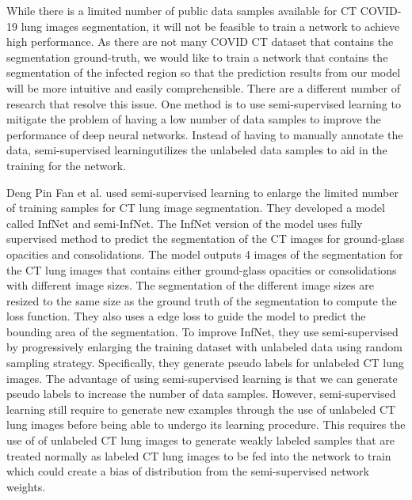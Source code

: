 While there is a limited number of public data samples available for CT COVID-19 lung images segmentation, it will not be feasible to train a network to achieve high performance. As there are not many COVID CT dataset that contains the segmentation ground-truth, we would like to train a network that contains the segmentation of the infected region so that the prediction results from our model will be more intuitive and easily comprehensible. There are a different number of research that resolve this issue. One method is to use semi-supervised learning to mitigate the problem of having a low number of data samples to improve the performance of deep neural networks. Instead of having to manually annotate the data, semi-supervised learningutilizes the unlabeled data samples to aid in the training for the network.

Deng Pin Fan et al. \cite{ref14} used semi-supervised learning to enlarge the limited number of training samples for CT lung image segmentation. They developed a model called InfNet and semi-InfNet. The InfNet version of the model uses fully supervised method to predict the segmentation of the CT images for ground-glass opacities and consolidations. The model outputs 4 images of the segmentation for the CT lung images that contains either ground-glass opacities or consolidations with different image sizes. The segmentation of the different image sizes are resized to the same size as the ground truth of the segmentation to compute the loss function. They also uses a edge loss to guide the model to predict the bounding area of the segmentation. To improve InfNet, they use semi-supervised by progressively enlarging the training dataset with unlabeled data using random sampling strategy. Specifically, they generate pseudo labels for unlabeled CT lung images. The advantage of using semi-supervised learning is that we can generate pseudo labels to increase the number of data samples. However, semi-supervised learning still require to generate new examples through the use of unlabeled CT lung images before being able to undergo its learning procedure. This requires the use of of unlabeled CT lung images to generate weakly labeled samples that are treated normally as labeled CT lung images to be fed into the network to train which could create a bias of distribution from the semi-supervised network weights.

